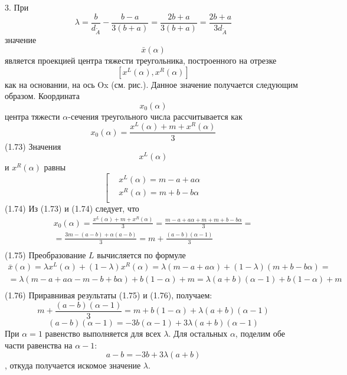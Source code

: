 3. При \[\lambda =\frac{b}{{{d}_{{\tilde{A}}}}}-\frac{b-a}{3\left( b+a \right)}=\frac{2b+a}{3\left( b+a \right)}=\frac{2b+a}{3{{d}_{{\tilde{A}}}}}\] значение \[\bar{x}(\alpha )\] является проекцией центра тяжести треугольника, построенного на отрезке \[\left[ {{x}^{L}}(\alpha ),{{x}^{R}}(\alpha ) \right]\] как на основании, на ось Ox (см. рис.).
Данное значение получается следующим образом. Координата \[{{x}_{0}}\left( \alpha  \right)\] центра тяжести $\alpha $-сечения треугольного числа рассчитывается как
	\[{{x}_{0}}\left( \alpha  \right)=\frac{{{x}^{L}}\left( \alpha  \right)+m+{{x}^{R}}\left( \alpha  \right)}{3}\] 	(1.73)
Значения \[{{x}^{L}}\left( \alpha  \right)\] и ${{x}^{R}}\left( \alpha  \right)$ равны
	\[\left[ \begin{aligned}
  & {{x}^{L}}\left( \alpha  \right)=m-a+a\alpha  \\ 
 & {{x}^{R}}\left( \alpha  \right)=m+b-b\alpha  \\ 
\end{aligned} \right.\] 	(1.74)
Из (1.73) и (1.74) следует, что
	\[\begin{matrix}
  {{x}_{0}}\left( \alpha  \right)=\frac{{{x}^{L}}\left( \alpha  \right)+m+{{x}^{R}}\left( \alpha  \right)}{3}=\frac{m-a+a\alpha +m+m+b-b\alpha }{3}= \\ 
  =\frac{3m-\left( a-b \right)+\alpha \left( a-b \right)}{3}=m+\frac{\left( a-b \right)\left( \alpha -1 \right)}{3} \\ 
\end{matrix}\] 	(1.75)
Преобразование $L$ вычисляется по формуле
	\[\begin{matrix}
  \bar{x}\left( \alpha  \right)=\lambda {{x}^{L}}\left( \alpha  \right)+\left( 1-\lambda  \right){{x}^{R}}\left( \alpha  \right)=\lambda \left( m-a+a\alpha  \right)+\left( 1-\lambda  \right)\left( m+b-b\alpha  \right)= \\ 
  =\lambda \left( m-a+a\alpha -m-b+b\alpha  \right)+b\left( 1-\alpha  \right)+m=\lambda \left( a+b \right)\left( \alpha -1 \right)+b\left( 1-\alpha  \right)+m \\ 
\end{matrix}\] 	(1.76)
Приравнивая результаты (1.75) и (1.76), получаем:
	\[m+\frac{\left( a-b \right)\left( \alpha -1 \right)}{3}=m+b\left( 1-\alpha  \right)+\lambda \left( a+b \right)\left( \alpha -1 \right)\] 
	\[\left( a-b \right)\left( \alpha -1 \right)=-3b\left( \alpha -1 \right)+3\lambda \left( a+b \right)\left( \alpha -1 \right)\] 
При $\alpha =1$ равенство выполняется для всех $\lambda $. Для остальных $\alpha $, поделим обе части равенства на $\alpha -1$:
	\[a-b=-3b+3\lambda \left( a+b \right)\],
откуда получается искомое значение $\lambda $.

